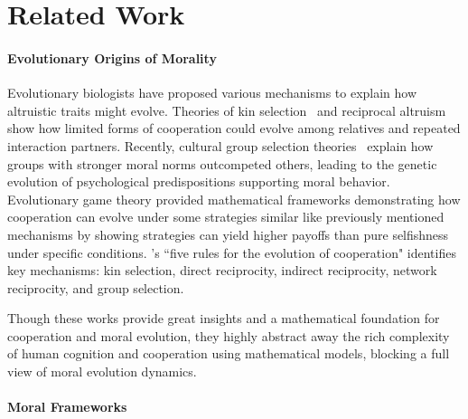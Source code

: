 \documentclass[letterpaper]{article} %
\begin{document}




\section{Related Work}

\paragraph{Evolutionary Origins of Morality}

Evolutionary biologists have proposed various mechanisms to explain how altruistic traits might evolve. Theories of kin selection~\citep{hamilton1964genetical} and reciprocal altruism~\citep{trivers1971evolution} show how limited forms of cooperation could evolve among relatives and repeated interaction partners. Recently, cultural group selection theories~\citep{boyd2011cultural, henrich2015secret} explain how groups with stronger moral norms outcompeted others, leading to the genetic evolution of psychological predispositions supporting moral behavior.
Evolutionary game theory provided mathematical frameworks demonstrating how cooperation can evolve under some strategies similar like previously mentioned mechanisms by showing strategies can yield higher payoffs than pure selfishness under specific conditions. \citet{nowak2006five}'s ``five rules for the evolution of cooperation" identifies key mechanisms: kin selection, direct reciprocity, indirect reciprocity, network reciprocity, and group selection. 

Though these works provide great insights and a mathematical foundation for cooperation and moral evolution, they highly abstract away the rich complexity of human cognition and cooperation using mathematical models, blocking a full view of moral evolution dynamics.

\paragraph{Moral Frameworks}
\end{document}

